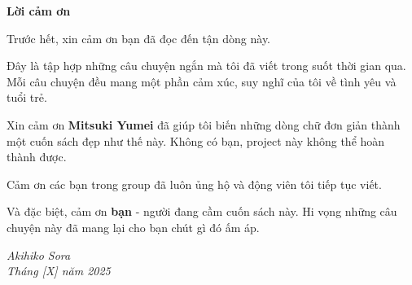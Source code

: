 \clearpage
\thispagestyle{plain}

\vspace*{2cm}

\begin{center}
    {\Large\titlefont\textbf{Lời cảm ơn}}
\end{center}

\vspace{1.5cm}

\begin{flushright}
\begin{minipage}{0.9\textwidth}

Trước hết, xin cảm ơn bạn đã đọc đến tận dòng này.

Đây là tập hợp những câu chuyện ngắn mà tôi đã viết trong suốt thời gian qua. 
Mỗi câu chuyện đều mang một phần cảm xúc, suy nghĩ của tôi về tình yêu và tuổi trẻ.

Xin cảm ơn \textbf{Mitsuki Yumei} đã giúp tôi biến những dòng chữ đơn giản 
thành một cuốn sách đẹp như thế này. Không có bạn, project này không thể 
hoàn thành được.

Cảm ơn các bạn trong group đã luôn ủng hộ và động viên tôi tiếp tục viết.

Và đặc biệt, cảm ơn \textbf{bạn} - người đang cầm cuốn sách này. 
Hi vọng những câu chuyện này đã mang lại cho bạn chút gì đó ấm áp.

\vspace{1cm}

\begin{flushright}
\textit{Akihiko Sora}\\
\textit{Tháng [X] năm 2025}
\end{flushright}

\end{minipage}
\end{flushright}

\clearpage
\thispagestyle{plain}

\vspace*{3cm}

